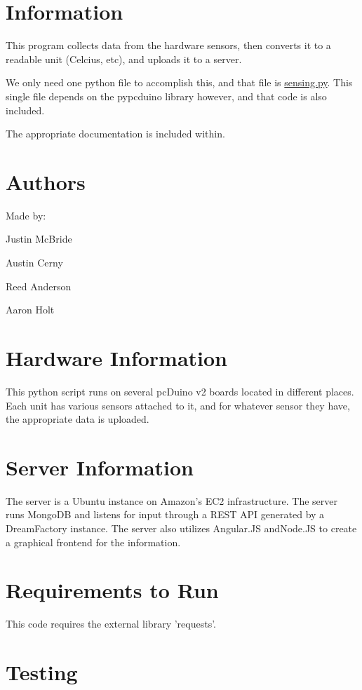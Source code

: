 \hypertarget{index_information}{}\section{Information}\label{index_information}
This program collects data from the hardware sensors, then converts it to a readable unit (Celcius, etc), and uploads it to a server.

We only need one python file to accomplish this, and that file is \hyperlink{sensing_8py}{sensing.\-py}. This single file depends on the pypcduino library however, and that code is also included.

The appropriate documentation is included within.\hypertarget{index_authors}{}\section{Authors}\label{index_authors}
Made by\-:
\begin{DoxyItemize}
\item Justin Mc\-Bride
\item Austin Cerny
\item Reed Anderson
\item Aaron Holt
\end{DoxyItemize}\hypertarget{index_hardwareinfo}{}\section{Hardware Information}\label{index_hardwareinfo}
This python script runs on several pc\-Duino v2 boards located in different places. Each unit has various sensors attached to it, and for whatever sensor they have, the appropriate data is uploaded.\hypertarget{index_serverinfo}{}\section{Server Information}\label{index_serverinfo}
The server is a Ubuntu instance on Amazon's E\-C2 infrastructure. The server runs Mongo\-D\-B and listens for input through a R\-E\-S\-T A\-P\-I generated by a Dream\-Factory instance. The server also utilizes Angular.\-J\-S and\-Node.\-J\-S to create a graphical frontend for the information.\hypertarget{index_requirements}{}\section{Requirements to Run}\label{index_requirements}
This code requires the external library 'requests'.\hypertarget{index_testing}{}\section{Testing}\label{index_testing}
